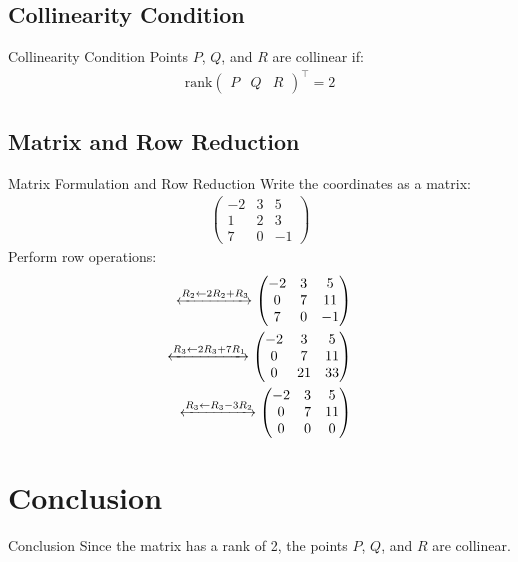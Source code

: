 \documentclass{beamer}
\theoremstyle{remark}
\numberwithin{equation}{section}
\begin{document}
\subsection{Collinearity Condition}
\begin{frame}{Collinearity Condition}
    Points $ P $, $ Q $, and $ R $ are collinear if:
	\begin{align}
    \text{rank} \begin{pmatrix} P & Q & R \end{pmatrix}^\top = 2
	\end{align}
\end{frame}


\subsection{Matrix and Row Reduction}
\begin{frame}{Matrix Formulation and Row Reduction}
    Write the coordinates as a matrix:
	\begin{align}
    	\begin{pmatrix}
    	-2 & 3 & 5 \\
	    1 & 2 & 3 \\
	    7 & 0 & -1
	\end{pmatrix}
	\end{align}
    Perform row operations:
	\begin{align}
	\xleftrightarrow[]{R_2 \leftarrow 2 R_2 + R_3} \begin{pmatrix} -2 & 3 & 5 \\ 0 & 7 & 11 \\ 7 & 0 & -1 \end{pmatrix}\\    
	\xleftrightarrow[]{R_3 \leftarrow 2 R_3 + 7 R_1} \begin{pmatrix} -2 & 3 & 5 \\ 0 & 7 & 11 \\ 0 & 21 & 33 \end{pmatrix}\\
    	\xleftrightarrow[]{R_3 \leftarrow R_3 - 3 R_2 } \begin{pmatrix} -2 & 3 & 5 \\ 0 & 7 & 11 \\ 0 & 0 & 0 \end{pmatrix}
	\end{align}
\end{frame}


\section{Conclusion}
\begin{frame}{Conclusion}
    Since the matrix has a rank of 2, the points $ P $, $ Q $, and $ R $ are collinear.
\end{frame}
\end{document}
